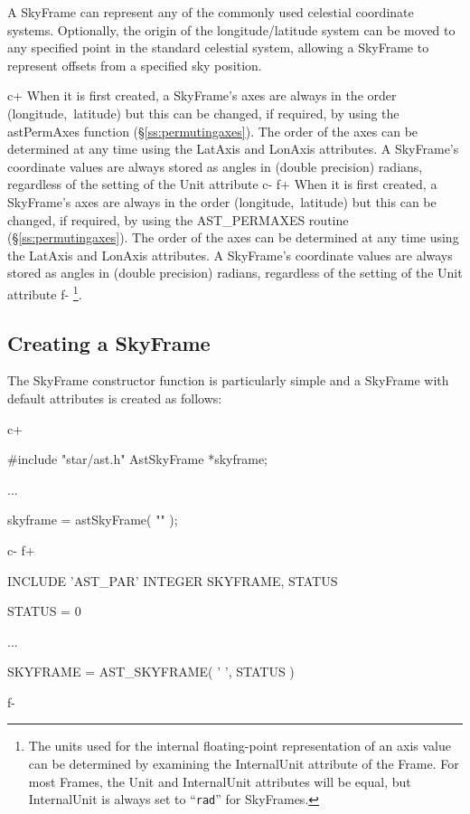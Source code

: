 \documentclass[twoside,11pt]{starlink}
\providecommand{\secref}[1]{\S\ref{#1}}
\begin{document}
A SkyFrame can represent any of the commonly used celestial coordinate
systems. Optionally, the origin of the longitude/latitude system can be
moved to any specified point in the standard celestial system, allowing
a SkyFrame to represent offsets from a specified sky position.

c+
When it is first created, a SkyFrame's axes are always in the order
(longitude,~latitude) but this can be changed, if required, by using the
astPermAxes function (\secref{ss:permutingaxes}). The order of the axes
can be determined at any time using the LatAxis and LonAxis attributes. A
SkyFrame's coordinate values are always stored as angles in (double
precision) radians, regardless of the setting of the Unit attribute
c-
f+
When it is first created, a SkyFrame's axes are always in the order
(longitude,~latitude) but this can be changed, if required, by using the
AST\_PERMAXES routine (\secref{ss:permutingaxes}). The order of the axes
can be determined at any time using the LatAxis and LonAxis attributes. A
SkyFrame's coordinate values are always stored as angles in (double
precision) radians, regardless of the setting of the Unit attribute
f-
\footnote{The units used for the internal floating-point representation of an
axis value can be determined by examining the InternalUnit attribute of
the Frame. For most Frames, the Unit and InternalUnit attributes will be
equal, but InternalUnit is always set to ``\texttt{rad}'' for SkyFrames.}.

\subsection{Creating a SkyFrame}

The SkyFrame constructor function is particularly simple and a
SkyFrame with default attributes is created as follows:

c+
\small
\begin{terminalv}
#include "star/ast.h"
AstSkyFrame *skyframe;

...

skyframe = astSkyFrame( "" );
\end{terminalv}
\normalsize
c-
f+
\small
\begin{terminalv}
      INCLUDE 'AST_PAR'
      INTEGER SKYFRAME, STATUS

      STATUS = 0

      ...

      SKYFRAME = AST_SKYFRAME( ' ', STATUS )
\end{terminalv}
\normalsize
f-
\end{document}
